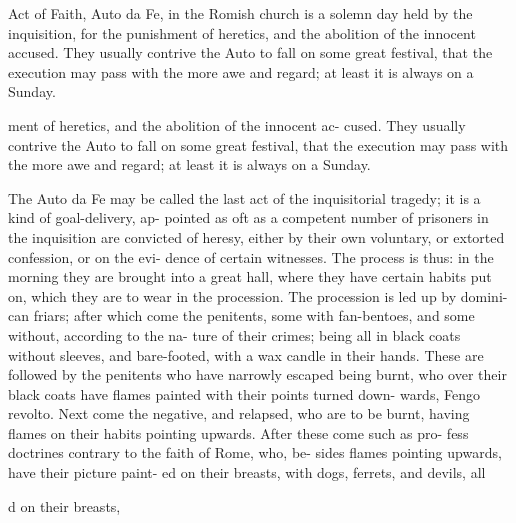 \documentclass{article}
\begin{document}
Act of Faith, Auto da Fe, in the Romish church is a solemn day held by the inquisition, for the punishment of heretics, and the abolition of the innocent accused. They usually contrive the Auto to fall on some great festival, that the execution may pass with the more awe and regard; at least it is always on a Sunday.

ment of heretics, and the abolition of the innocent ac-
cused. They usually contrive the Auto to fall on some
great festival, that the execution may pass with the
more awe and regard; at least it is always on a Sunday.

The Auto da Fe may be called the last act of the
inquisitorial tragedy; it is a kind of goal-delivery, ap-
pointed as oft as a competent number of prisoners in
the inquisition are convicted of heresy, either by their
own voluntary, or extorted confession, or on the evi-
dence of certain witnesses. The process is thus: in the
morning they are brought into a great hall, where
they have certain habits put on, which they are to wear
in the procession. The procession is led up by domini-
can friars; after which come the penitents, some with
fan-bentoes, and some without, according to the na-
ture of their crimes; being all in black coats without
sleeves, and bare-footed, with a wax candle in their
hands. These are followed by the penitents who have
narrowly escaped being burnt, who over their black
coats have flames painted with their points turned down-
wards, Fengo revolto. Next come the negative, and
relapsed, who are to be burnt, having flames on their
habits pointing upwards. After these come such as pro-
fess doctrines contrary to the faith of Rome, who, be-
sides flames pointing upwards, have their picture paint-
ed on their breasts, with dogs, ferrets, and devils, all

d on their breasts,
\end{document}

